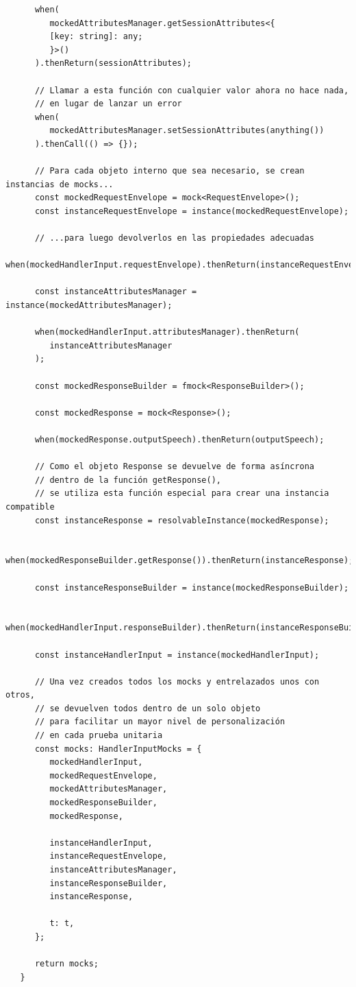 \documentclass[11pt,spanish,listoffigures,listoftables,table,hyphens,dvipsnames]{tfgetsinf}
\begin{document}
\begin{lstlisting}
      when(
         mockedAttributesManager.getSessionAttributes<{
         [key: string]: any;
         }>()
      ).thenReturn(sessionAttributes);

      // Llamar a esta función con cualquier valor ahora no hace nada,
      // en lugar de lanzar un error
      when(
         mockedAttributesManager.setSessionAttributes(anything())
      ).thenCall(() => {});

      // Para cada objeto interno que sea necesario, se crean instancias de mocks...
      const mockedRequestEnvelope = mock<RequestEnvelope>();
      const instanceRequestEnvelope = instance(mockedRequestEnvelope);

      // ...para luego devolverlos en las propiedades adecuadas
      when(mockedHandlerInput.requestEnvelope).thenReturn(instanceRequestEnvelope);

      const instanceAttributesManager = instance(mockedAttributesManager);

      when(mockedHandlerInput.attributesManager).thenReturn(
         instanceAttributesManager
      );

      const mockedResponseBuilder = fmock<ResponseBuilder>();

      const mockedResponse = mock<Response>();

      when(mockedResponse.outputSpeech).thenReturn(outputSpeech);

      // Como el objeto Response se devuelve de forma asíncrona
      // dentro de la función getResponse(),
      // se utiliza esta función especial para crear una instancia compatible
      const instanceResponse = resolvableInstance(mockedResponse);

      when(mockedResponseBuilder.getResponse()).thenReturn(instanceResponse);

      const instanceResponseBuilder = instance(mockedResponseBuilder);

      when(mockedHandlerInput.responseBuilder).thenReturn(instanceResponseBuilder);

      const instanceHandlerInput = instance(mockedHandlerInput);

      // Una vez creados todos los mocks y entrelazados unos con otros,
      // se devuelven todos dentro de un solo objeto
      // para facilitar un mayor nivel de personalización
      // en cada prueba unitaria
      const mocks: HandlerInputMocks = {
         mockedHandlerInput,
         mockedRequestEnvelope,
         mockedAttributesManager,
         mockedResponseBuilder,
         mockedResponse,

         instanceHandlerInput,
         instanceRequestEnvelope,
         instanceAttributesManager,
         instanceResponseBuilder,
         instanceResponse,

         t: t,
      };

      return mocks;
   }
\end{lstlisting}
\end{document}
